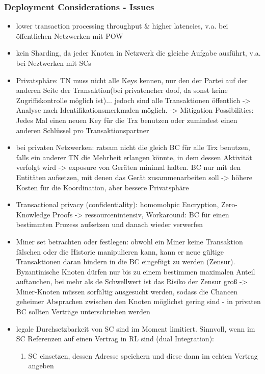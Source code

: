    \subsubsection*{Deployment Considerations - Issues}
        \begin{itemize}
            \item lower transaction processing throughput \& higher latencies, v.a. bei öffentlichen Netzwerken mit POW
            \item kein Sharding, da jeder Knoten in Netzwerk die gleiche Aufgabe ausführt, v.a. bei Neztwerken mit SCs
            \item Privatsphäre: TN muss nicht alle Keys kennen, nur den der Partei auf der anderen Seite der Transaktion(bei privateneher doof, da sonst keine Zugriffskontrolle möglich ist)... jedoch sind alle Transaktionen öffentlich -> Analyse nach Identifikationsmerkmalen möglich. -> Mitigation Possibilities: Jedes Mal einen neuen Key für die Trx benutzen oder zumindest einen anderen Schlüssel pro Transaktionspartner
            \item bei privaten Netzwerken: ratsam nicht die gleich BC für alle Trx benutzen, falls ein anderer TN die Mehrheit erlangen könnte, in dem dessen Aktivität verfolgt wird -> exposure von Geräten minimal halten. BC nur mit den Entitäten aufsetzen, mit denen das Gerät zusammenarbeiten soll -> höhere Kosten für die Koordination, aber bessere Privatsphäre
            \item Transactional privacy (confidentiality): homomohpic Encryption, Zero-Knowledge Proofs -> ressourcenintensiv, Workaround: BC für einen bestimmten Prozess aufsetzen und danach wieder verwerfen
            \item Miner set betrachten oder festlegen: obwohl ein Miner keine Transaktion fälschen oder die Historie manipulieren kann, kann er neue gültige Transaktionen daran hindern in die BC eingefügt zu werden (Zensur). Byzantinische Knoten dürfen nur bis zu einem bestimmen maximalen Anteil auftauchen, bei mehr als de Schwellwert ist das Risiko der Zensur groß -> Miner-Knoten müssen sorfältig ausgesucht werden, sodass die Chancen geheimer Absprachen zwischen den Knoten möglichst gering sind - in privaten BC sollten Verträge unterschrieben werden
            \item legale Durchsetzbarkeit von SC sind im Moment limitiert. Sinnvoll, wenn im SC Referenzen auf einen Vertrag in RL sind (dual Integration): 
                \begin{enumerate}
                    \item SC einsetzen, dessen Adresse speichern und diese dann im echten Vertrag angeben

\end{enumerate}
\end{itemize}
